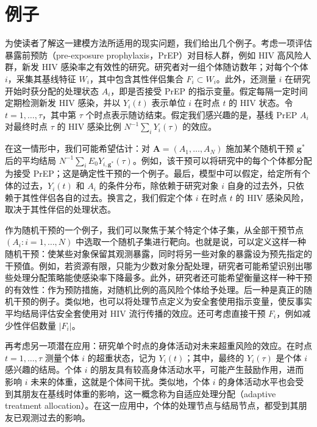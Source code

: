 \section{例子}

为使读者了解这一建模方法所适用的现实问题，我们给出几个例子。考虑一项评估暴露前预防（pre-exposure prophylaxis，PrEP）对目标人群，例如 HIV 高风险人群，新发 HIV 感染率之有效性的研究。研究者对一组个体随访数年；对每个个体 $i$，采集其基线特征 $W_i$，其中包含其性伴侣集合 $F_i\subset W_i$。此外，还测量 $i$ 在研究开始时获分配的处理状态 $A_i$，即是否接受 PrEP 的指示变量。假定每隔一定时间定期检测新发 HIV 感染，并以 $Y_i(t)$ 表示单位 $i$ 在时点 $t$ 的 HIV 状态。令 $t=1,\ldots,\tau$，其中第 $\tau$ 个时点表示随访结束。假定我们感兴趣的是，基线 PrEP $A_i$ 对最终时点 $\tau$ 的 HIV 感染比例 $N^{-1}\sum_iY_i(\tau)$ 的效应。

在这一情形中，我们可能希望估计：对 $\mathbf A=(A_1,\ldots,A_N)$ 施加某个随机干预 $\mathbf g^*$ 后的平均结局 $N^{-1}\sum_iE_0Y_{i,\mathbf g^*}(\tau)$。例如，该干预可以将研究中的每个个体都分配为接受 PrEP；这是确定性干预的一个例子。最后，模型中可以假定，给定所有个体的过去，$Y_i(t)$ 和 $A_i$ 的条件分布，除依赖于研究对象 $i$ 自身的过去外，只依赖于其性伴侣各自的过去。换言之，我们假定个体 $i$ 在时点 $t$ 的 HIV 感染风险，取决于其性伴侣的处理状态。

作为随机干预的一个例子，我们可以聚焦于某个特定个体子集，从全部干预节点 $(A_i:i=1,\ldots,N)$ 中选取一个随机子集进行靶向。也就是说，可以定义这样一种随机干预：使某些对象保留其观测暴露，同时将另一些对象的暴露设为预先指定的干预值。例如，若资源有限，只能为少数对象分配处理，研究者可能希望识别出哪些处理分配策略能使感染率下降最多。此外，研究者还可能希望衡量这样一种干预的有效性：作为预防措施，对随机比例的高风险个体给予处理。后一种是真正的随机干预的例子。类似地，也可以将处理节点定义为安全套使用指示变量，使反事实平均结局评估安全套使用对 HIV 流行传播的效应。还可考虑直接干预 $F_i$，例如减少性伴侣数量 $|F_i|$。

再考虑另一项潜在应用：研究单个时点的身体活动对未来超重风险的效应。在时点 $t=1,\ldots,\tau$ 测量个体 $i$ 的超重状态，记为 $Y_i(t)$；其中，最终的 $Y_i(\tau)$ 是个体 $i$ 感兴趣的结局。个体 $i$ 的朋友具有较高身体活动水平，可能产生鼓励作用，进而影响 $i$ 未来的体重，这就是个体间干扰。类似地，个体 $i$ 的身体活动水平也会受到其朋友在基线时体重的影响，这一概念称为自适应处理分配（adaptive treatment allocation）。在这一应用中，个体的处理节点与结局节点，都受到其朋友已观测过去的影响。
